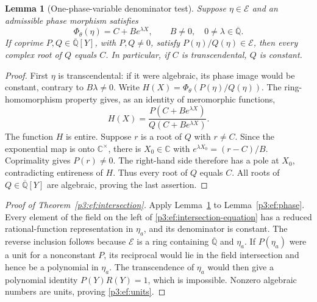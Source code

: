 \documentclass[11pt,a4paper]{article}
\newtheorem{lemma}[theorem]{Lemma}
\theoremstyle{definition}
\theoremstyle{remark}
\numberwithin{equation}{section}
\begin{document}
\begin{lemma}[One-phase-variable denominator test]
\label{p3:ef:denominator}
Suppose $\eta\in\mathcal E$ and an admissible phase morphism satisfies
\[
 \Phi_\theta(\eta)=C+B e^{\lambda X},
 \qquad B\ne0,\quad 0\ne\lambda\in\overline{\mathbb Q}.
\]
If coprime $P,Q\in\overline{\mathbb Q}[Y]$, with $P,Q\ne0$, satisfy
$P(\eta)/Q(\eta)\in\mathcal E$, then every complex root of $Q$
equals $C$.  In particular, if $C$ is transcendental, $Q$ is constant.
\end{lemma}
\begin{proof}
First $\eta$ is transcendental: if it were algebraic, its phase image
would be constant, contrary to $B\lambda\ne0$.
Write $H(X)=\Phi_\theta(P(\eta)/Q(\eta))$.  The ring-homomorphism
property gives, as an identity of meromorphic functions,
\[
 H(X)=\frac{P(C+B e^{\lambda X})}{Q(C+B e^{\lambda X})}.
\]
The function $H$ is entire.  Suppose $r$ is a root of $Q$ with
$r\ne C$.  Since the exponential map is onto $\mathbb C^\times$,
there is $X_0\in\mathbb C$ with
$e^{\lambda X_0}=(r-C)/B$.  Coprimality gives $P(r)\ne0$.
The right-hand side therefore has a pole at $X_0$, contradicting
entireness of $H$.  Thus every root of $Q$ equals $C$.
All roots of $Q\in\overline{\mathbb Q}[Y]$ are algebraic, proving the
last assertion.
\end{proof}

\begin{proof}[Proof of Theorem~\ref{p3:ef:intersection}]
Apply Lemma~\ref{p3:ef:denominator} to Lemma~\ref{p3:ef:phase}.
Every element of the field on the left of
\eqref{p3:ef:intersection-equation} has a reduced rational-function
representation in $\eta_a$, and its denominator is constant.
The reverse inclusion follows because $\mathcal E$ is a ring
containing $\overline{\mathbb Q}$ and $\eta_a$.
If $P(\eta_a)$ were a unit for a nonconstant $P$, its reciprocal
would lie in the field intersection and hence be a polynomial in
$\eta_a$.  The transcendence of $\eta_a$ would then give a polynomial
identity $P(Y)R(Y)=1$, which is impossible.  Nonzero algebraic numbers
are units, proving \eqref{p3:ef:units}.
\end{proof}
\end{document}
